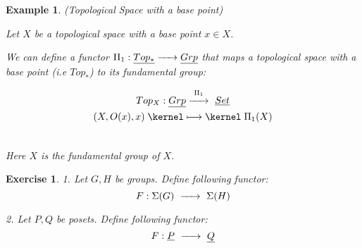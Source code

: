 \documentclass{article}
\newtheorem{example}{Example}[section]
\newtheorem{exercise}{Exercise}[section]
\renewcommand{\to}{\xrightarrow{\hspace{0.5cm}}}  %
\renewcommand{\mapsto}{\mathrel{\kernel\longmapsto\kernel}}  %
\begin{document}
    \vspace{0.2in}

    \begin{example} (Topological Space with a base point)

        Let $X$ be a topological space with a base point $x \in X$.

        We can define a functor $\Pi_1: \underline{Top_*} \to \underline{Grp}$ that maps a topological
        space with a base point (i.e $Top_*$) to its fundamental group:

        \begin{gather*}
            Top_X: \underline{Grp}  \stackrel{\Pi_1}{\to} \ \underline{Set}\\
            (X, O(x), x) \mapsto \Pi_1(X) \\\\
        \end{gather*}

        Here $X$ is the fundamental group of $X$.

    \end{example}

    \vspace{0.2in}

    \begin{exercise}
        1. Let $G, H$ be groups. Define following functor:
        \[
            F: \Sigma(G) \ \to \ \Sigma(H)\\
        \]

        2. Let $P, Q$ be posets. Define following functor:
        \[
            F: \underline{P} \ \to \ \underline{Q}\\
        \]
    \end{exercise}
\end{document}
